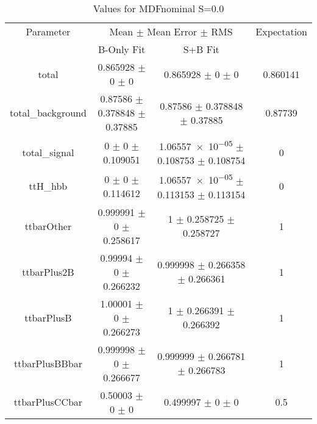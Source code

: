 \begin{table}
\centering
\caption{Values for MDFnominal S=0.0}
\begin{tabular}{cccc}
\toprule
Parameter & \multicolumn{2}{c}{Mean $\pm$ Mean Error $\pm$ RMS} & Expectation\\
 & B-Only Fit & S+B Fit & \\
\midrule
total & \num{0.865928} $\pm$ \num{0} $\pm$ \num{0} & \num{0.865928} $\pm$ \num{0} $\pm$ \num{0} & \num{0.860141}\\
total\_background & \num{0.87586} $\pm$ \num{0.378848} $\pm$ \num{0.37885} & \num{0.87586} $\pm$ \num{0.378848} $\pm$ \num{0.37885} & \num{0.87739}\\
total\_signal & \num{0} $\pm$ \num{0} $\pm$ \num{0.109051} & \num{1.06557e-05} $\pm$ \num{0.108753} $\pm$ \num{0.108754} & \num{0}\\
ttH\_hbb & \num{0} $\pm$ \num{0} $\pm$ \num{0.114612} & \num{1.06557e-05} $\pm$ \num{0.113153} $\pm$ \num{0.113154} & \num{0}\\
ttbarOther & \num{0.999991} $\pm$ \num{0} $\pm$ \num{0.258617} & \num{1} $\pm$ \num{0.258725} $\pm$ \num{0.258727} & \num{1}\\
ttbarPlus2B & \num{0.99994} $\pm$ \num{0} $\pm$ \num{0.266232} & \num{0.999998} $\pm$ \num{0.266358} $\pm$ \num{0.266361} & \num{1}\\
ttbarPlusB & \num{1.00001} $\pm$ \num{0} $\pm$ \num{0.266273} & \num{1} $\pm$ \num{0.266391} $\pm$ \num{0.266392} & \num{1}\\
ttbarPlusBBbar & \num{0.999998} $\pm$ \num{0} $\pm$ \num{0.266677} & \num{0.999999} $\pm$ \num{0.266781} $\pm$ \num{0.266783} & \num{1}\\
ttbarPlusCCbar & \num{0.50003} $\pm$ \num{0} $\pm$ \num{0} & \num{0.499997} $\pm$ \num{0} $\pm$ \num{0} & \num{0.5}\\
\bottomrule
\end{tabular}
\end{table}